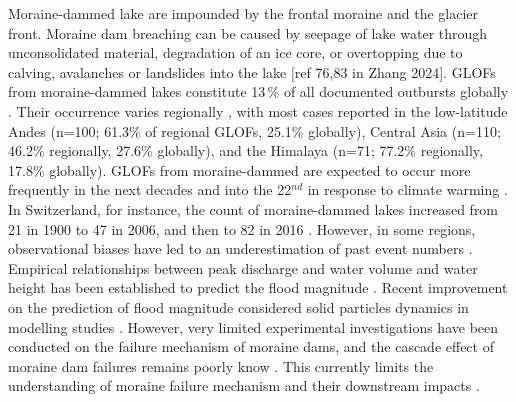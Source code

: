 Moraine-dammed lake are impounded by the frontal moraine and the glacier front. Moraine dam breaching can be caused by seepage of lake water through unconsolidated material, degradation of an ice core, or overtopping due to calving, avalanches or landslides into the lake [ref 76,83 in Zhang 2024]. GLOFs from moraine-dammed lakes constitute 13\,\% of all documented outbursts globally \citep{Lutzow&al2023}. Their occurrence varies regionally \citep{Zhang&al2024}, with most cases reported in the low-latitude Andes (n=100; 61.3\% of regional GLOFs, 25.1\% globally), Central Asia (n=110; 46.2\% regionally, 27.6\% globally), and the Himalaya (n=71; 77.2\% regionally, 17.8\% globally). GLOFs from moraine-dammed are expected to occur more frequently in the next decades and into the 22$^{nd}$ in response to climate warming \citep{Harrison&al2018}. In Switzerland, for instance, the count of moraine-dammed lakes increased from 21 in 1900 to 47 in 2006, and then to 82 in 2016 \cite{Zhang&al2024}. However, in some regions, observational biases have led to an underestimation of past event numbers \citep{Veh&al2022}. %
Empirical relationships between peak discharge and water volume and water height has been established to predict the flood magnitude \citep[see][for a review on moraine-dammed lake failure]{Neupane&al2019}. Recent improvement on the prediction of flood magnitude considered solid particles dynamics in modelling studies \citep[e.g.][]{Mergili&al2018}. However, very limited experimental investigations have been conducted on the failure mechanism of moraine dams, and the cascade effect of moraine dam failures remains poorly know \citep{Somos-Valenzuela&al2016}. This currently limits the understanding of moraine failure mechanism and their downstream impacts \citep{Neupane&al2019}. 




